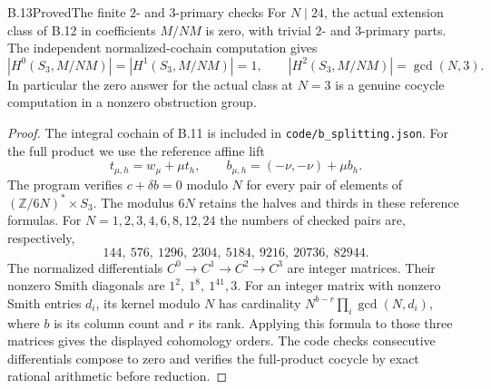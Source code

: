 \begin{statement}{B.13}{Proved}{The finite \(2\)- and \(3\)-primary checks}
For \(N\mid24\), the actual extension class of B.12 in coefficients
\(M/NM\) is zero, with trivial \(2\)- and \(3\)-primary parts.
The independent normalized-cochain computation gives
\[
 \left|H^0(S_3,M/NM)\right|=\left|H^1(S_3,M/NM)\right|=1,
 \qquad \left|H^2(S_3,M/NM)\right|=\gcd(N,3).
\]
In particular the zero answer for the actual class at \(N=3\)
is a genuine cocycle computation in a nonzero obstruction group.
\end{statement}
\begin{proof}
The integral cochain of B.11 is included in
\texttt{code/b\_splitting.json}. For the full product we use the
reference affine lift
\[
 t_{\mu,h}=w_\mu+\mu t_h,\qquad
 b_{\mu,h}=(-\nu,-\nu)+\mu b_h.
\]
The program verifies \(c+\delta b=0\) modulo \(N\) for every pair of
elements of \((\mathbb Z/6N)^*\times S_3\). The modulus \(6N\)
retains the halves and thirds in these reference formulas.
For \(N=1,2,3,4,6,8,12,24\) the numbers of checked pairs are,
respectively,
\[
 144,\ 576,\ 1296,\ 2304,\ 5184,\ 9216,\ 20736,\ 82944.
\]
The normalized differentials \(C^0\to C^1\to C^2\to C^3\)
are integer matrices. Their nonzero Smith diagonals are
\(1^2,\ 1^8,\ 1^{41},3\).
For an integer matrix with nonzero Smith entries \(d_i\), its kernel
modulo \(N\) has cardinality \(N^{b-r}\prod_i\gcd(N,d_i)\),
where \(b\) is its column count and \(r\) its rank.
Applying this formula to those three matrices gives the displayed
cohomology orders. The code checks consecutive differentials compose
to zero and verifies the full-product cocycle by exact rational
arithmetic before reduction.
\end{proof}

